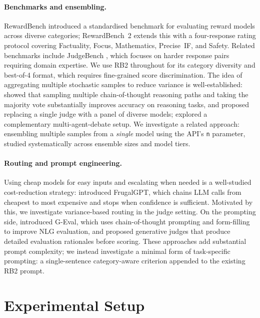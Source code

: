 \documentclass{article}
\begin{document}
\paragraph{Benchmarks and ensembling.} RewardBench \citep{lambert2025rewardbench} introduced a standardised benchmark for evaluating reward models across diverse categories; RewardBench~2 \citep{malik2025rewardbench2} extends this with a four-response rating protocol covering Factuality, Focus, Mathematics, Precise~IF, and Safety. Related benchmarks include JudgeBench \citep{tan2025judgebench}, which focuses on harder response pairs requiring domain expertise. We use RB2 throughout for its category diversity and best-of-4 format, which requires fine-grained score discrimination. The idea of aggregating multiple stochastic samples to reduce variance is well-established: \citet{wang2023selfconsistency} showed that sampling multiple chain-of-thought reasoning paths and taking the majority vote substantially improves accuracy on reasoning tasks, and \citet{verga2024replacing} proposed replacing a single judge with a panel of diverse models; \citet{chan2024chateval} explored a complementary multi-agent-debate setup. We investigate a related approach: ensembling multiple samples from a \emph{single} model using the API's \texttt{n} parameter, studied systematically across ensemble sizes and model tiers.

\paragraph{Routing and prompt engineering.} Using cheap models for easy inputs and escalating when needed is a well-studied cost-reduction strategy: \citet{chen2024frugalgpt} introduced FrugalGPT, which chains LLM calls from cheapest to most expensive and stops when confidence is sufficient. Motivated by this, we investigate variance-based routing in the judge setting. On the prompting side, \citet{liu2023geval} introduced G-Eval, which uses chain-of-thought prompting and form-filling to improve NLG evaluation, and \citet{li2024generative} proposed generative judges that produce detailed evaluation rationales before scoring. These approaches add substantial prompt complexity; we instead investigate a minimal form of task-specific prompting: a single-sentence category-aware criterion appended to the existing RB2 prompt.

\section{Experimental Setup}
\label{sec:setup}
\end{document}
